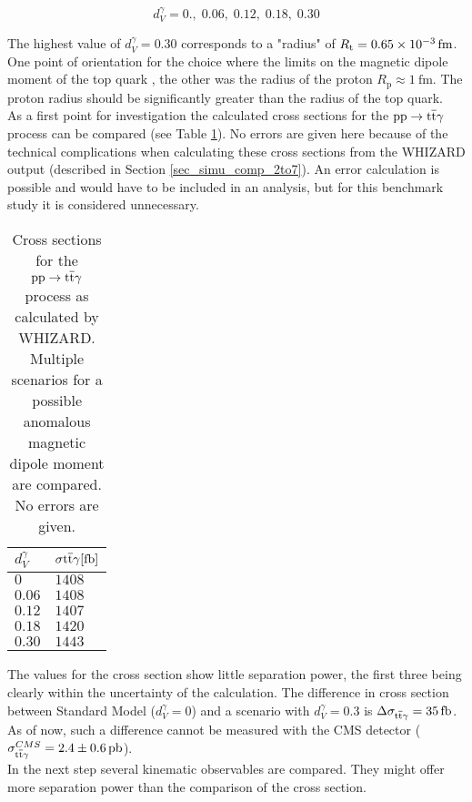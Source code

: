 \begin{equation}
d_V^{\gamma} = 0.,\; 0.06,\; 0.12,\; 0.18,\; 0.30
\label{eq_ano_val}
\end{equation}

The highest value of $d_V^{\gamma} = 0.30$ corresponds to a "radius" of $R_{\mathrm{t}} = \SI{0.65d-3}{\femto \meter}$. One point of orientation for the choice where the limits on the magnetic dipole moment of the top quark \cite{Englert:2012by}, the other was the radius of the proton $R_{\mathrm{p}} \approx \SI{1}{\femto \meter}$. The proton radius should be significantly greater than the radius of the top quark. \\
As a first point for investigation the calculated cross sections for the $\mathrm{pp} \to \mathrm{t}\overline{\mathrm{t}} \gamma $ process can be compared (see Table \ref{tab_ano_crosssec}). No errors are given here because of the technical complications when calculating these cross sections from the WHIZARD output (described in Section \ref{sec_simu_comp_2to7}). An error calculation is possible and would have to be included in an analysis, but for this benchmark study it is considered unnecessary.

\begin{table}[ht]
\centering
    \caption{Cross sections for the $\mathrm{pp} \to \mathrm{t}\overline{\mathrm{t}} \gamma$ process as calculated by WHIZARD. Multiple scenarios for a possible anomalous magnetic dipole moment are compared. No errors are given.}
    \begin{tabular}{| l | l |}

    \hline
    $d_{V}^{\gamma}$ & $\sigma{\ttgamma} [\SI{}{\femto \barn}]$ \\
    \hline
    $0$ &  $1408$\\
    \hline
    $0.06$ & $1408 $ \\
    \hline
    $0.12$ & $1407 $ \\
    \hline
    $0.18$ & $1420 $ \\
    \hline
    $0.30$ &  $1443 $\\
    \hline
    \end{tabular}
     \label{tab_ano_crosssec}
\end{table}

The values for the cross section show little separation power, the first three being clearly within the uncertainty of the calculation. The difference in cross section between Standard Model ($d_V^{\gamma} = 0$)  and a scenario with $d_V^{\gamma} = 0.3$ is $\Delta \sigma_{\ttgamma} = \SI{35}{\femto \barn}$. As of now, such a difference cannot be measured with the CMS detector  ($\sigma^{CMS}_{\ttgamma} = \SI{2.4 \pm 0.6}{\pico \barn}$\cite{CMS-PAS-TOP-13-011}).\\
In the next step several kinematic observables are compared. They might offer more separation power than the comparison of the cross section.

